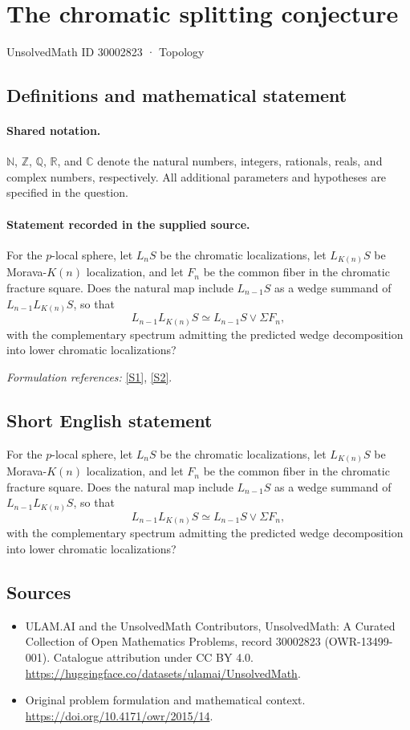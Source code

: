 \documentclass[11pt]{article}
\newcommand{\sref}[2]{\hyperlink{source:#1:#2}{[S#2]}}
\begin{document}
\setcounter{section}{30002822}
\section{The chromatic splitting conjecture}\label{30002823}
{\small UnsolvedMath ID 30002823 · Topology}
\subsection{Definitions and mathematical statement}

\paragraph{Shared notation.}$\mathbb N$, $\mathbb Z$, $\mathbb Q$, $\mathbb R$, and $\mathbb C$ denote the natural numbers, integers, rationals, reals, and complex numbers, respectively. All additional parameters and hypotheses are specified in the question.


\paragraph{Statement recorded in the supplied source.}
For the $p$-local sphere, let $L_nS$ be the chromatic localizations, let $L_{K(n)}S$ be Morava-$K(n)$ localization, and let $F_n$ be the common fiber in the chromatic fracture square. Does the natural map include $L_{n-1}S$ as a wedge summand of $L_{n-1}L_{K(n)}S$, so that
\[L_{n-1}L_{K(n)}S\simeq L_{n-1}S\vee\Sigma F_n,\]
with the complementary spectrum admitting the predicted wedge decomposition into lower chromatic localizations?
\par\smallskip\textit{Formulation references:} \sref{30002823}{1}, \sref{30002823}{2}.
\subsection{Short English statement}
For the $p$-local sphere, let $L_nS$ be the chromatic localizations, let $L_{K(n)}S$ be Morava-$K(n)$ localization, and let $F_n$ be the common fiber in the chromatic fracture square. Does the natural map include $L_{n-1}S$ as a wedge summand of $L_{n-1}L_{K(n)}S$, so that
\[L_{n-1}L_{K(n)}S\simeq L_{n-1}S\vee\Sigma F_n,\]
with the complementary spectrum admitting the predicted wedge decomposition into lower chromatic localizations?
\subsection{Sources}
\begin{itemize}
\item[\hypertarget{source:30002823:1}{S1}] ULAM.AI and the UnsolvedMath Contributors, UnsolvedMath: A Curated Collection of Open Mathematics Problems, record 30002823 (OWR-13499-001). Catalogue attribution under CC BY 4.0.
\url{https://huggingface.co/datasets/ulamai/UnsolvedMath}.
\item[\hypertarget{source:30002823:2}{S2}] Original problem formulation and mathematical context.
\url{https://doi.org/10.4171/owr/2015/14}.
\end{itemize}
\label{end:30002823}
\end{document}
